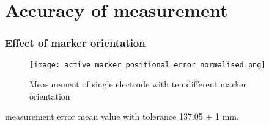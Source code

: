 \section{Accuracy of measurement}
\begin{frame}
	\frametitle{Effect of marker orientation}
	\begin{figure}[hbt!]
		\centering
		\texttt{[image: active\_marker\_positional\_error\_normalised.png]}
		\caption{Measurement of single electrode with ten different marker orientation} 
		\label{fig:active_marker_normalised_positional_error}
	\end{figure}
	
\begin{block}{measurement error}
		mean value with tolerance 137.05 $\pm$ 1 mm.
\end{block}
		
\end{frame}


